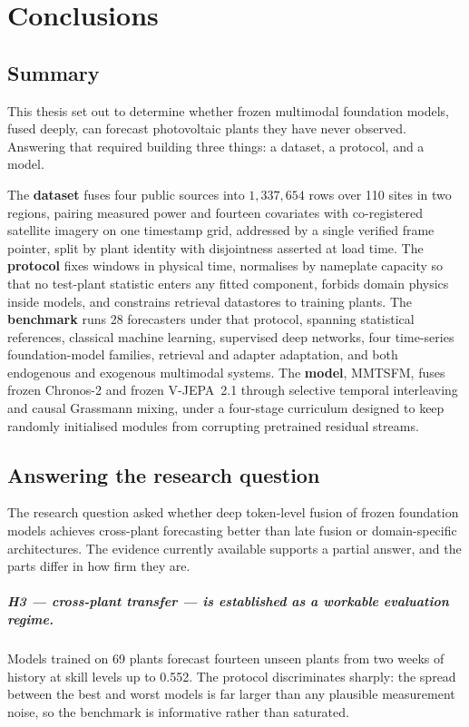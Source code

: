 \chapter{Conclusions}
\label{cha:conclusion}

\section{Summary}
\label{sec:summary}

This thesis set out to determine whether frozen multimodal foundation models, fused deeply,
can forecast photovoltaic plants they have never observed. Answering that required building
three things: a dataset, a protocol, and a model.

The \textbf{dataset} fuses four public sources into $1{,}337{,}654$ rows over 110 sites in
two regions, pairing measured power and fourteen covariates with co-registered satellite
imagery on one timestamp grid, addressed by a single verified frame pointer, split by plant
identity with disjointness asserted at load time. The \textbf{protocol} fixes windows in
physical time, normalises by nameplate capacity so that no test-plant statistic enters any
fitted component, forbids domain physics inside models, and constrains retrieval datastores
to training plants. The \textbf{benchmark} runs 28 forecasters under that protocol, spanning
statistical references, classical machine learning, supervised deep networks, four
time-series foundation-model families, retrieval and adapter adaptation, and both endogenous
and exogenous multimodal systems. The \textbf{model}, MMTSFM, fuses frozen Chronos-2 and
frozen V-JEPA~2.1 through selective temporal interleaving and causal Grassmann mixing, under
a four-stage curriculum designed to keep randomly initialised modules from corrupting
pretrained residual streams.

\section{Answering the research question}
\label{sec:answer}

The research question asked whether deep token-level fusion of frozen foundation models
achieves cross-plant forecasting better than late fusion or domain-specific architectures.
The evidence currently available supports a partial answer, and the parts differ in how firm
they are.

\paragraph{H3 --- cross-plant transfer --- is established as a workable evaluation regime.}
Models trained on 69 plants forecast fourteen unseen plants from two weeks of history at
skill levels up to 0.552. The protocol discriminates sharply: the spread between the best and
worst models is far larger than any plausible measurement noise, so the benchmark is
informative rather than saturated.

